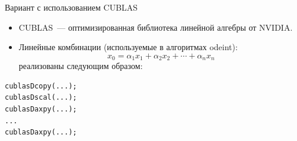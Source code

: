 \documentclass[@BEAMER_OPTIONS@]{beamer}
\begin{document}

\begin{frame}[fragile]{Вариант с использованием CUBLAS}
    \begin{itemize}
        \item CUBLAS~--- оптимизированная библиотека линейной алгебры от NVIDIA.
        \item Линейные комбинации (используемые в алгоритмах odeint):
            \begin{equation*}
                x_0 = \alpha_1 x_1 + \alpha_2 x_2 + \cdots + \alpha_n x_n
            \end{equation*}
            реализованы следующим образом:
    \end{itemize}
    \begin{exampleblock}{}
        \begin{lstlisting}[numbers=none]
cublasDcopy(...);
cublasDscal(...);
cublasDaxpy(...);
...
cublasDaxpy(...);
        \end{lstlisting}
    \end{exampleblock}
\end{frame}
\end{document}
